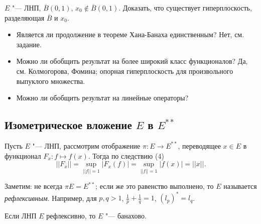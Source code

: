 \documentclass[main]{subfiles}
\begin{document}
\begin{exercise}
  $E$ "--- ЛНП, $\overline{B}(0, 1)$, $x_0 \notin \overline{B}(0, 1)$.
  Доказать, что существует гиперплоскость, разделяющая $\overline{B}$
  и $x_0$.
\end{exercise}

\begin{remark}
  \begin{itemize}
    \item Является ли продолжение в теореме Хана-Банаха
      единственным? Нет, см. задание.
    \item Можно ли обобщить результат на более широкий класс
      функционалов? Да, см. Колмогорова, Фомина;
      опорная гиперплоскость для произвольного выпуклого множества.
    \item Можно ли обобщить результат на линейные операторы?
  \end{itemize}
\end{remark}

\subsection{Изометрическое вложение $E$ в $E^{**}$}
Пусть $E$ "--- ЛНП, рассмотрим отображение $\pi : E \to E^{**}$,
переводящее $x \in E$ в функционал $F_x : f \mapsto f(x)$.
Тогда по следствию (4)
\[
  ||F_x|| = \sup_{||f|| = 1} |F_x(f)| =
  \sup_{||f|| = 1} |f(x)| = ||x||.
\]

Заметим: не всегда $\pi E = E^{**}$; если же это равенство выполнено,
то $E$ называется \emph{рефлексивным}. Например, для $p, q > 1$,
$\frac1p + \frac1q = 1$, $(l_p)^* = l_q$.

\begin{exercise}
  Если ЛНП $E$ рефлексивно, то $E$ "--- банахово.
\end{exercise}
\end{document}

